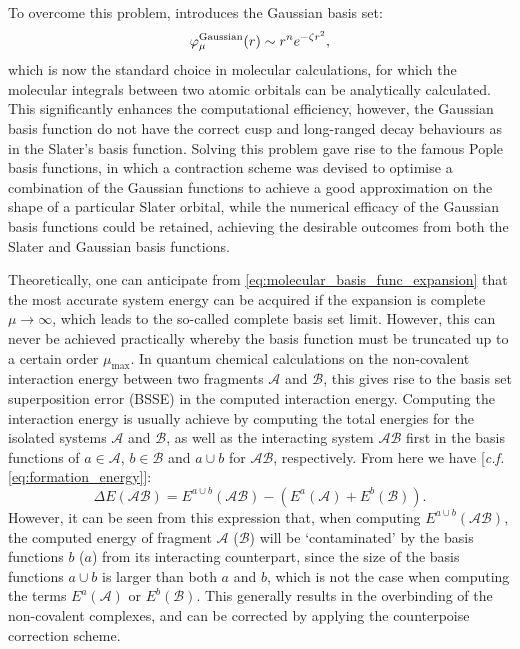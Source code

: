 To overcome this problem, \citet{boys1950electronic} introduces the Gaussian basis set:
\begin{equation}
\varphi_{\mu}^{\mbox{{\scriptsize{Gaussian}}}}(r)\sim r^n e^{-\zeta r^2},
\end{equation}
which is now the standard choice in molecular calculations, for which the molecular integrals between two atomic orbitals can be analytically calculated. This significantly enhances the computational efficiency, however, the Gaussian basis function do not have the correct cusp and long-ranged decay behaviours as in the Slater's basis function. Solving this problem gave rise to the famous Pople basis functions\cite{hehre1969self}, in which a contraction scheme was devised to optimise a combination of the Gaussian functions to achieve a good approximation on the shape of a particular Slater orbital, while the numerical efficacy of the Gaussian basis functions could be retained, achieving the desirable outcomes from both the Slater and Gaussian basis functions. 

Theoretically, one can anticipate from  \cref{eq:molecular_basis_func_expansion} that the most accurate system energy can be acquired if the expansion is complete $\mu\to\infty$, which leads to the so-called complete basis set limit. However, this can never be achieved practically whereby the basis function must be truncated up to a certain order $\mu_{\max}$. In quantum chemical calculations on the non-covalent interaction energy between two fragments $\mathcal{A}$ and $\mathcal{B}$, this gives rise to the basis set superposition error (BSSE)\cite{boys1970calculation} in the computed interaction energy. Computing the interaction energy is usually achieve by computing the total energies for the isolated systems $\mathcal{A}$ and $\mathcal{B}$, as well as the interacting system $\mathcal{AB}$ first in the basis functions of $a\in\mathcal{A}$, $b\in\mathcal{B}$ and $a\cup b$ for $\mathcal{AB}$, respectively. From here we have [\emph{c.f.} \cref{eq:formation_energy}]:
\begin{equation}
    \Delta E(\mathcal{AB})=E^{a\cup b}(\mathcal{AB})-\left(E^{a}(\mathcal{A})+E^{b}(\mathcal{B}) \right).
\end{equation}
However, it can be seen from this expression that, when computing $E^{a\cup b}(\mathcal{AB})$, the computed energy of fragment $\mathcal{A}$ ($\mathcal{B}$) will be `contaminated' by the basis functions $b$ ($a$) from its interacting counterpart, since the size of the basis functions $a\cup b$ is larger than both $a$ and $b$, which is not the case when computing the terms $E^{a}(\mathcal{A})$ or $E^{b}(\mathcal{B})$. This generally results in the overbinding of the non-covalent complexes, and can be corrected by applying the counterpoise correction scheme.



